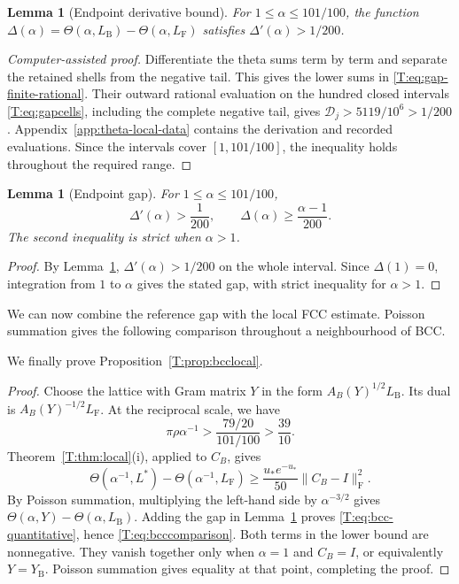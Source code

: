 \documentclass[reqno,english]{amsart}
\newtheorem{lemma}[theorem]{Lemma}
\theoremstyle{definition}
\newtheorem{open problem}[theorem]{Open Problem}
\theoremstyle{remark}
\theoremstyle{plain}
\numberwithin{equation}{section}
\newcommand{\FCC}{L_{\mathrm F}}
\newcommand{\B}{L_{\mathrm B}}
\newcommand{\BCC}{\B}
\newcommand{\YB}{Y_{\mathrm B}}
\newcommand{\frob}{\mathrm F}
\newcommand{\Th}{\Theta}
\begin{document}
\begin{lemma}[Endpoint derivative bound]\label{app:lem:endpoint-derivative}
For $1\le\alpha\le101/100$, the function
$\Delta(\alpha)=\Th(\alpha,\BCC)-\Th(\alpha,\FCC)$ satisfies
$\Delta'(\alpha)>1/200$.
\end{lemma}
\begin{proof}[Computer-assisted proof]
Differentiate the theta sums term by term and separate the retained
shells from the negative tail. This gives the lower sums in
\eqref{T:eq:gap-finite-rational}. Their outward rational evaluation
on the hundred closed intervals \eqref{T:eq:gapcells}, including
the complete negative tail, gives $\mathscr D_j>5119/10^6>1/200$.
Appendix~\ref{app:theta-local-data} contains the derivation and
recorded evaluations. Since the intervals cover $[1,101/100]$, the
inequality holds throughout the required range.
\end{proof}

\begin{lemma}[Endpoint gap]\label{T:lem:gap}
For $1\le\alpha\le101/100$,
\begin{equation}\label{T:eq:gapderivative}
 \Delta'(\alpha)>\frac1{200},
 \qquad
 \Delta(\alpha)\ge\frac{\alpha-1}{200}.
\end{equation}
The second inequality is strict when $\alpha>1$.
\end{lemma}
\begin{proof}
By Lemma~\ref{app:lem:endpoint-derivative},
$\Delta'(\alpha)>1/200$ on the whole interval. Since $\Delta(1)=0$,
integration from $1$ to $\alpha$ gives the stated gap, with strict
inequality for $\alpha>1$.
\end{proof}

We can now combine the reference gap with the local FCC estimate.
Poisson summation gives the following comparison throughout a
neighbourhood of BCC.

We finally prove Proposition~\ref{T:prop:bcclocal}.

\begin{proof}
Choose the lattice with Gram matrix $Y$ in the form
$A_B(Y)^{1/2}\BCC$. Its dual is $A_B(Y)^{-1/2}\FCC$.
At the reciprocal scale, we have
\[
 \pi\rho\alpha^{-1}>\frac{79/20}{101/100}>\frac{39}{10}.
\]
Theorem~\ref{T:thm:local}(i), applied to $C_B$, gives
\[
 \Th(\alpha^{-1},L^*)-\Th(\alpha^{-1},\FCC)
 \ge \frac{u_*e^{-u_*}}{50}\|C_B-I\|_{\frob}^2.
\]
By Poisson summation, multiplying the left-hand side by
$\alpha^{-3/2}$ gives $\Th(\alpha,Y)-\Th(\alpha,\BCC)$.
Adding the gap in Lemma~\ref{T:lem:gap} proves
\eqref{T:eq:bcc-quantitative}, hence \eqref{T:eq:bcccomparison}.
Both terms in the lower bound are nonnegative. They vanish together
only when $\alpha=1$ and $C_B=I$, or equivalently $Y=\YB$.
Poisson summation gives equality at that point, completing the proof.
\end{proof}
\end{document}
